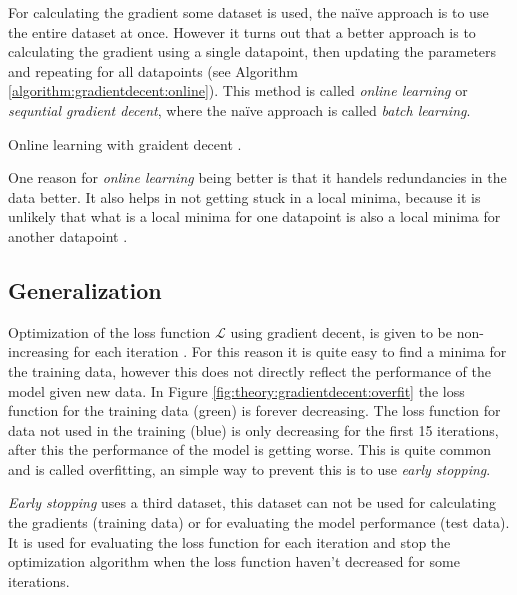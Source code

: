 For calculating the gradient some dataset is used, the naïve approach is to use the entire dataset at once. However it turns out that a better approach is to calculating the gradient using a single datapoint, then updating the parameters and repeating for all datapoints (see Algorithm \ref{algorithm:gradientdecent:online}). This method is called \textit{online learning} or \textit{sequntial gradient decent}, where the naïve approach is called \textit{batch learning}.

\begin{algorithm}[h]
 \DontPrintSemicolon
 \caption{Online learning with graident decent \cite{alexgraves}.}
 \label{algorithm:gradientdecent:online}
\end{algorithm}

One reason for \textit{online learning} being better is that it handels redundancies in the data better. It also helps in not getting stuck in a local minima, because it is unlikely that what is a local minima for one datapoint is also a local minima for another datapoint \cite{bishop}.

\subsection{Generalization}

Optimization of the loss function $\mathcal{L}$ using gradient decent, is given to be non-increasing for each iteration \cite{bishop}. For this reason it is quite easy to find a minima for the training data, however this does not directly reflect the performance of the model given new data. In Figure \ref{fig:theory:gradientdecent:overfit} the loss function for the training data (green) is forever decreasing. The loss function for data not used in the training (blue) is only decreasing for the first 15 iterations, after this the performance of the model is getting worse. This is quite common and is called overfitting, an simple way to prevent this is to use \textit{early stopping}.

\textit{Early stopping} uses a third dataset, this dataset can not be used for calculating the gradients (training data) or for evaluating the model performance (test data). It is used for evaluating the loss function for each iteration and stop the optimization algorithm when the loss function haven't decreased for some iterations. \cite{the-elements-of-statistical-learning, bishop, alexgraves}

